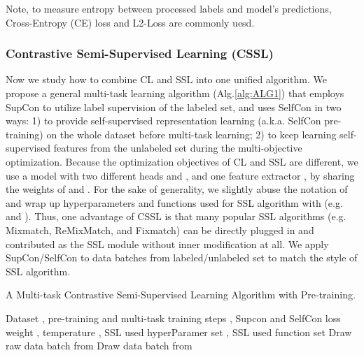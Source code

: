 \documentclass[letterpaper]{article} \usepackage{aaai22}  \usepackage{times}  \usepackage{helvet}  \usepackage{courier}  \usepackage[hyphens]{url}  \usepackage{graphicx} \usepackage{subfigure}
\begin{document}
Note, to measure entropy between processed labels and model's predictions, Cross-Entropy (CE) loss and L2-Loss are commonly uesd. 
\subsubsection{Contrastive Semi-Supervised Learning (CSSL)}
Now we study how to combine CL and SSL into one unified algorithm. We propose a general multi-task learning algorithm (Alg.\ref{alg:ALG1}) that employs SupCon to utilize label supervision of the labeled set, and uses SelfCon in two ways: 1) to provide self-supervised representation learning (a.k.a. SelfCon pre-training) on the whole dataset before multi-task learning; 2) to keep learning self-supervised features from the unlabeled set during the multi-objective optimization. Because the optimization objectives of CL and SSL are different, we use a model   with two different heads  and , and one feature extractor , by sharing the weights of  and . For the sake of generality, we slightly abuse the notation of  and wrap up hyperparameters and functions used for SSL algorithm with  (e.g.  and ). Thus, one advantage of CSSL is that many popular SSL algorithms (e.g. Mixmatch, ReMixMatch, and Fixmatch) can be directly plugged in and contributed as the SSL module without inner modification at all. We apply SupCon/SelfCon to data batches from labeled/unlabeled set to match the style of SSL algorithm.
\begin{algorithm}
\renewcommand{\algorithmicrequire}{\textbf{Input:}}
\renewcommand{\algorithmicensure}{\textbf{Output:}}
\renewcommand{\algorithmiccomment}{ \ \ \ // }
\caption{A Multi-task Contrastive Semi-Supervised Learning Algorithm with Pre-training. }
\begin{algorithmic}[1]
\REQUIRE Dataset , pre-training and multi-task training steps , Supcon and SelfCon loss weight , temperature , SSL used hyperParamer set , SSL used function set 
\WHILE{} 
    \STATE Draw raw data batch  from   
    \STATE   {} 
    \STATE   {} 
    \STATE 
    \STATE 
\ENDWHILE
\WHILE{} 
    \STATE Draw data batch  from  
    \FOR{}
    \STATE  
    \STATE  
    \ENDFOR
    \STATE 
    \STATE 
    \STATE  {}
    \STATE 
    \STATE 
\ENDWHILE
\end{algorithmic}
\label{alg:ALG1}
\end{algorithm}
\end{document}

